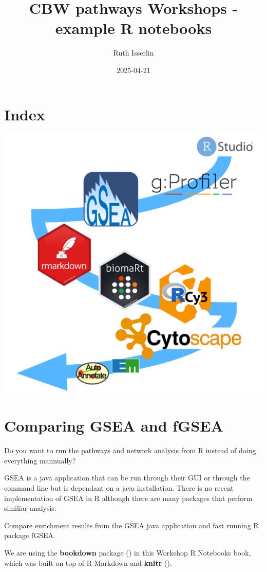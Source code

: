 \documentclass[
]{book}
\title{CBW pathways Workshops - example R notebooks}
\author{Ruth Isserlin}
\date{2025-04-21}
\begin{document}
\maketitle

{
\setcounter{tocdepth}{1}
\tableofcontents
}
\chapter{Index}\label{index}

\includegraphics{./images/cover.png}

\chapter{Comparing GSEA and fGSEA}\label{intro}

Do you want to run the pathways and network analysis from R instead of doing everything mannually?

GSEA is a java application that can be run through their GUI or through the command line but is dependant on a java installation. There is no recent implementation of GSEA in R although there are many packages that perform similiar analysis.

Compare enrichment results from the GSEA java application and fast running R package fGSEA.

We are using the \textbf{bookdown} package () in this Workshop R Notebooks book, which was built on top of R Markdown and \textbf{knitr} ().
\end{document}
